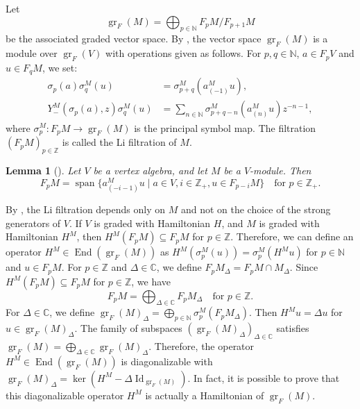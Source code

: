 \documentclass[a4paper, 12pt, reqno]{amsart}
\newtheorem{lemma}[theorem]{Lemma}
\theoremstyle{remark}
\DeclareMathOperator{\gr}{gr}
\DeclareMathOperator{\vspan}{span}
\DeclareMathOperator{\End}{End}
\DeclareMathOperator{\Id}{Id}
\begin{document}
Let
\begin{equation*}
  \gr_F(M) = \bigoplus_{p \in \mathbb{N}}F_pM/F_{p + 1}M
\end{equation*}
be the associated graded vector space.
By \cite{li_abelianizing_2005}, the vector space $\gr_F(M)$ is a module over $\gr_F(V)$ with operations given as follows.
For $p, q \in \mathbb{N}$, $a \in F_pV$ and $u \in F_qM$, we set:
\begin{align*}
  \sigma_p(a)\sigma^M_q(u) &= \sigma^M_{p + q}(a^M_{(-1)}u), \\
  Y^M_-(\sigma_p(a), z)\sigma^M_q(u) &= \sum_{n \in \mathbb{N}}\sigma^M_{p + q - n}(a^M_{(n)}u)z^{-n - 1},
\end{align*}
where $\sigma^M_p: F_pM \to \gr_F(M)$ is the principal symbol map.
The filtration $(F_pM)_{p \in \mathbb{Z}}$ is called the Li filtration of $M$.

\begin{lemma}[{\cite[Lemma 2.9]{li_abelianizing_2005}}]
  \label{lmm:4}
  Let $V$ be a vertex algebra, and let $M$ be a $V$-module.
  Then
  \begin{equation*}
    F_pM = \vspan\{a^M_{(-i - 1)}u \mid a \in V, i \in \mathbb{Z}_+, u \in F_{p - i}M\} \quad \text{for $p \in \mathbb{Z}_+$}.
  \end{equation*}
\end{lemma}

By , the Li filtration depends only on $M$ and not on the choice of the strong generators of $V$.
If $V$ is graded with Hamiltonian $H$, and $M$ is graded with Hamiltonian $H^M$, then $H^M(F_pM) \subseteq F_pM$ for $p \in \mathbb{Z}$.
Therefore, we can define an operator $H^M \in \End(\gr_F(M))$ as $H^M(\sigma^M_p(u)) = \sigma^M_p(H^Mu)$ for $p \in \mathbb{N}$ and $u \in F_pM$.
For $p \in \mathbb{Z}$ and $\Delta \in \mathbb{C}$, we define $F_pM_{\Delta} = F_pM \cap M_{\Delta}$.
Since $H^M(F_pM) \subseteq F_pM$ for $p \in \mathbb{Z}$, we have
\begin{equation*}
  F_pM = \bigoplus_{\Delta \in \mathbb{C}}F_pM_{\Delta} \quad \text{for $p \in \mathbb{Z}$}.
\end{equation*}
For $\Delta \in \mathbb{C}$, we define $\gr_F(M)_{\Delta} = \bigoplus_{p \in \mathbb{N}}\sigma^M_p(F_pM_{\Delta})$.
Then $H^Mu = \Delta u$ for $u \in \gr_F(M)_{\Delta}$.
The family of subspaces $(\gr_F(M)_{\Delta})_{\Delta \in \mathbb{C}}$ satisfies $\gr_F(M) = \bigoplus_{\Delta \in \mathbb{C}}\gr_F(M)_{\Delta}$.
Therefore, the operator $H^M \in \End(\gr_F(M))$ is diagonalizable with $\gr_F(M)_{\Delta} = \ker(H^M - \Delta\Id_{\gr_F(M)})$.
In fact, it is possible to prove that this diagonalizable operator $H^M$ is actually a Hamiltonian of $\gr_F(M)$.
\end{document}
